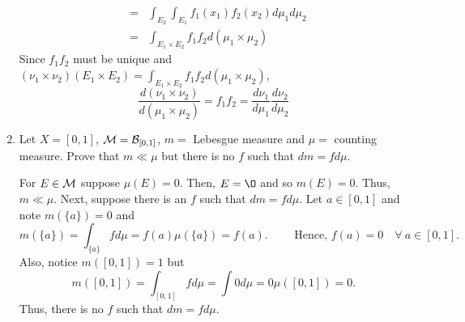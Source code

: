 \begin{enumerate}
\begin{pf}
\begin{eqnarray*}
	& = & \int_{E_2} \int_{E_1} f_1 (x_1) f_2 (x_2) d \mu_1   d \mu_2 \\
	& = & \int_{E_1 \times E_2} f_1 f_2 d (\mu_1 \times \mu_2)
\end{eqnarray*}
Since $f_1f_2$ must be unique and $(\nu_1 \times \nu_2)(E_1 \times E_2) = \int_{E_1 \times E_2} f_1 f_2 d (\mu_1 \times \mu_2)$, 
\[
\frac{d(\nu_1 \times \nu_2)}{d(\mu_1 \times \mu_2)}= f_1 f_2 = \frac{d \nu_1}{d \mu_1}   \frac{d \nu_2}{d \mu_2}
\]
\end{pf}
\item Let $X= [0,1]$, ${\mathcal M} = {\mathcal B}_{[0,1]}$, $m=$ Lebesgue measure and $\mu=$ counting measure. Prove that $m \ll \mu$ but there is no $f$ such that $dm = f d \mu$.
\begin{pf}
	For $E \in {\mathcal M}$ suppose $\mu(E)=0$. Then, $E = \O$ and so $m(E)=0$. Thus, $m \ll \mu$. Next, suppose there is an $f$ such that $dm = f d \mu$. Let $a \in [0, 1]$ and note $m(\{ a \})=0$ and 
	\[
	m(\{a\}) = \int_{\{a\}} f d \mu = f(a) \mu (\{ a \}) = f(a). \qquad \text{ Hence, } f(a) = 0 \quad \forall \ a \in [0,1].
	\]
	Also, notice $m([0,1])=1$ but 
	\[
	m([0,1]) = \int_{[0,1]}f d \mu = \int 0 d \mu = 0 \mu([0,1]) = 0.
	\]
	Thus, there is no $f$ such that $dm = f d \mu$.
\end{pf}
\end{enumerate}
